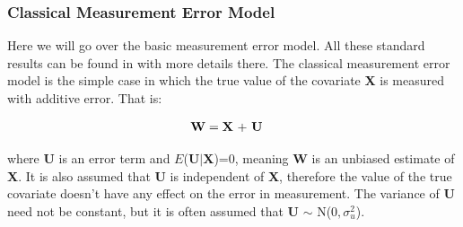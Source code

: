 \documentclass[11pt]{article}\usepackage[]{graphicx}\usepackage[]{color}
\begin{document}
% 

\subsubsection{Classical Measurement Error Model}
Here we will go over the basic measurement error model. All these standard results can be found in \cite{linear} with more details there. The classical measurement error model is the simple case in which the true value of the covariate {\bf X} is measured with additive error. That is:

\begin{align}
	\text{{\bf W}} &= \text{{\bf X} + {\bf U}}
	\label{classical}
\end{align}

where {\bf U} is an error term and $E$({\bf U$|$X})=0, meaning {\bf W} is an unbiased estimate of {\bf X}. It is also assumed that {\bf U} is independent of {\bf X}, therefore the value of the true covariate doesn't have any effect on the error in measurement. The variance of {\bf U} need not be constant, but it is often assumed that {\bf U} $\sim$ N($0,\sigma_u^2$). \\
\end{document}
